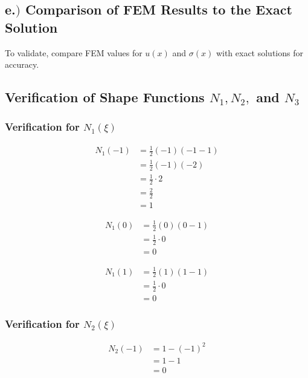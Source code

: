 \subsection*{e.$)$ Comparison of FEM Results to the Exact Solution}

To validate, compare FEM values for \( u(x) \) and \( \sigma(x) \) with exact solutions for accuracy.

\subsection*{Verification of Shape Functions \( N_1, N_2, \) and \( N_3 \)}

\subsubsection*{Verification for \( N_1(\xi) \)}

\begin{align*}
    N_1(-1) &= \frac{1}{2}(-1)(-1 - 1) \\
            &= \frac{1}{2}(-1)(-2) \\
            &= \frac{1}{2} \cdot 2 \\
            &= \frac{2}{2} \\
            &= 1
\end{align*}

\begin{align*}
    N_1(0) &= \frac{1}{2}(0)(0 - 1) \\
           &= \frac{1}{2} \cdot 0 \\
           &= 0
\end{align*}

\begin{align*}
    N_1(1) &= \frac{1}{2}(1)(1 - 1) \\
           &= \frac{1}{2} \cdot 0 \\
           &= 0
\end{align*}

\subsubsection*{Verification for \( N_2(\xi) \)}

\begin{align*}
    N_2(-1) &= 1 - (-1)^2 \\
            &= 1 - 1 \\
            &= 0
\end{align*}

